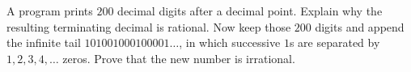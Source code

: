 A program prints $200$ decimal digits after a decimal point. Explain why the resulting terminating decimal is rational. Now keep those $200$ digits and append the infinite tail $101001000100001\ldots$, in which successive $1$s are separated by $1,2,3,4,\ldots$ zeros. Prove that the new number is irrational.
